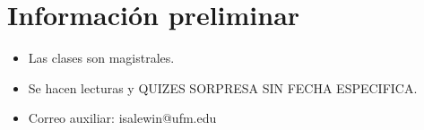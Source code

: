 \section{Información preliminar}
\begin{itemize}
    \item Las clases son magistrales.
    \item Se hacen lecturas y QUIZES SORPRESA SIN FECHA ESPECIFICA.
    \item Correo auxiliar: isalewin@ufm.edu 
\end{itemize}

